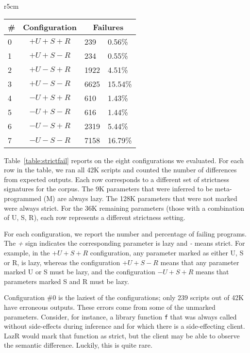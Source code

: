 \documentclass[review,creen,acmsmall]{acmart}
\renewcommand{\c}[1]{\lstinline |#1|\xspace}
\newcommand{\lazr}{{\sf LazR}\xspace}
\newcommand{\cconfig}[1]{Configuration \#{#1}}
\begin{document}
\begin{wraptable}{r}{5cm}
  \small
  \caption{Strictness Failure} \label{table:strictfail}
  \centering
  \begin{tabular}{lc|ll}
    \toprule
    \#&\textbf{Configuration}&\multicolumn{2}{c}{\textbf{Failures}}\\
    \midrule
    0&$+U+S+R$&239&0.56\%\\
    1&$+U+S-R$&234&0.55\%\\
    2&$+U-S+R$&1922&4.51\%\\
    3&$+U-S-R$&6625&15.54\%\\
    4&$-U+S+R$&610&1.43\%\\
    5&$-U+S-R$&616&1.44\%\\
    6&$-U-S+R$&2319&5.44\%\\
    7&$-U-S-R$&7158&16.79\%\\
    \bottomrule
  \end{tabular}
\end{wraptable}

Table~\ref{table:strictfail} reports on the eight configurations we evaluated.
For each row in the table, we ran all 42K scripts and counted the number of
differences from expected outputs. Each row corresponds to a different set of
strictness signatures for the corpus. The 9K parameters that were inferred to be
meta-programmed (M) are always lazy. The 128K parameters that were not marked
were always strict. For the 36K remaining parameters (those with a combination
of U, S, R), each row represents a different strictness setting.

For each configuration, we report the number and percentage of failing programs.
The \emph{+} sign indicates the corresponding parameter is lazy and \emph{-}
means strict. For example, in the $+U+S+R$ configuration, any parameter marked
as either U, S or R, is lazy, whereas the configuration $+U+S-R$ means that any
parameter marked U or S must be lazy, and the configuration $-U+S+R$ means that
parameters marked S and R must be lazy.

\cconfig 0 is the laziest of the configurations; only 239 scripts out of 42K
have erroneous outputs. These errors come from some of the
unmarked parameters. Consider, for instance, a library function \c f that was
always called without side-effects during inference and for which there is a
side-effecting client. \lazr would mark that function as strict, but the client
may be able to observe the semantic difference. Luckily, this is quite rare.
\end{document}
